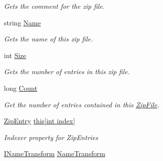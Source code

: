 \begin{DoxyCompactItemize}
\begin{DoxyCompactList}\small\item\em Gets the comment for the zip file. \end{DoxyCompactList}\item 
string \hyperlink{class_i_c_sharp_code_1_1_sharp_zip_lib_1_1_zip_1_1_zip_file_a9c0da1463531c7c804f2821b848afb3b}{Name}
\begin{DoxyCompactList}\small\item\em Gets the name of this zip file. \end{DoxyCompactList}\item 
int \hyperlink{class_i_c_sharp_code_1_1_sharp_zip_lib_1_1_zip_1_1_zip_file_aa11eb80b9ce4b3e7b2a8a0e719e57eea}{Size}
\begin{DoxyCompactList}\small\item\em Gets the number of entries in this zip file. \end{DoxyCompactList}\item 
long \hyperlink{class_i_c_sharp_code_1_1_sharp_zip_lib_1_1_zip_1_1_zip_file_abaa59b25ef1c078ba89e234d27981d71}{Count}
\begin{DoxyCompactList}\small\item\em Get the number of entries contained in this \hyperlink{class_i_c_sharp_code_1_1_sharp_zip_lib_1_1_zip_1_1_zip_file}{Zip\+File}. \end{DoxyCompactList}\item 
\hyperlink{class_i_c_sharp_code_1_1_sharp_zip_lib_1_1_zip_1_1_zip_entry}{Zip\+Entry} \hyperlink{class_i_c_sharp_code_1_1_sharp_zip_lib_1_1_zip_1_1_zip_file_a2ff49688780b206987d5577c7cfa75b5}{this\mbox{[}int index\mbox{]}}
\begin{DoxyCompactList}\small\item\em Indexer property for Zip\+Entries \end{DoxyCompactList}\item 
\hyperlink{interface_i_c_sharp_code_1_1_sharp_zip_lib_1_1_core_1_1_i_name_transform}{I\+Name\+Transform} \hyperlink{class_i_c_sharp_code_1_1_sharp_zip_lib_1_1_zip_1_1_zip_file_a337a792814c1290647310888e0ff76e2}{Name\+Transform}

\end{DoxyCompactItemize}
